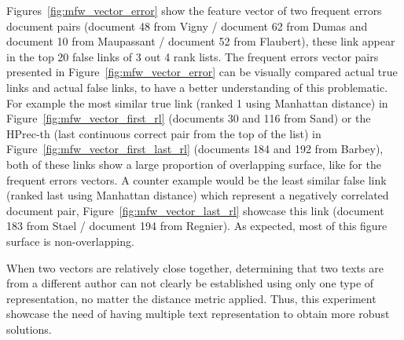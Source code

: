 Figures~\ref{fig:mfw_vector_error} show the feature vector of two frequent errors document pairs (document 48 from Vigny / document 62 from Dumas and document 10 from Maupassant / document 52 from Flaubert), these link appear in the top 20 false links of 3 out 4 rank lists.
The frequent errors vector pairs presented in Figure~\ref{fig:mfw_vector_error} can be visually compared actual true links and actual false links, to have a better understanding of this problematic.
For example the most similar true link (ranked 1 using Manhattan distance) in Figure~\ref{fig:mfw_vector_first_rl} (documents 30 and 116 from Sand) or the HPrec-th (last continuous correct pair from the top of the list) in Figure~\ref{fig:mfw_vector_first_last_rl} (documents 184 and 192 from Barbey), both of these links show a large proportion of overlapping surface, like for the frequent errors vectors.
A counter example would be the least similar false link (ranked last using Manhattan distance) which represent a negatively correlated document pair, Figure~\ref{fig:mfw_vector_last_rl} showcase this link (document 183 from Stael / document 194 from Regnier).
As expected, most of this figure surface is non-overlapping.

When two vectors are relatively close together, determining that two texts are from a different author can not clearly be established using only one type of representation, no matter the distance metric applied.
Thus, this experiment showcase the need of having multiple text representation to obtain more robust solutions.

